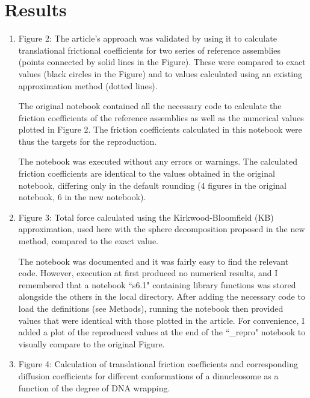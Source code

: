 \section{Results}

\begin{enumerate}

\item Figure 2: The article's approach was validated by using it to calculate translational frictional coefficients for two series of reference assemblies (points connected by solid lines in the Figure). These were compared to exact values (black circles in the Figure) and to values calculated using an existing approximation method (dotted lines).

The original notebook
contained all the necessary code to calculate the friction coefficients of the reference assemblies as well as the numerical values plotted in Figure 2. The friction coefficients calculated in this notebook were thus the targets for the reproduction.

The notebook was executed without any errors or warnings. The calculated friction coefficients are identical to the values obtained in the original notebook, differing only in the default rounding (4 figures in the original notebook, 6 in the new notebook).


\item Figure 3: Total force calculated using the Kirkwood-Bloomfield (KB) approximation, used here with the sphere decomposition proposed in the new method, compared to the exact value.

The notebook was documented and it was fairly easy to find the relevant code. However, execution at first produced no numerical results, and I remembered that a notebook ``s6.1" containing library functions was stored alongside the others in the local directory. 
After adding the necessary code to load the definitions (see Methods), running the notebook then provided values that were identical with those plotted in the article. For convenience, I added a plot of the reproduced values at the end of the ``\_repro" notebook to visually compare to the original Figure.


\item Figure 4: Calculation of translational friction coefficients and corresponding diffusion coefficients for different conformations of a dinucleosome as a function of the degree of DNA wrapping.


\end{enumerate}
